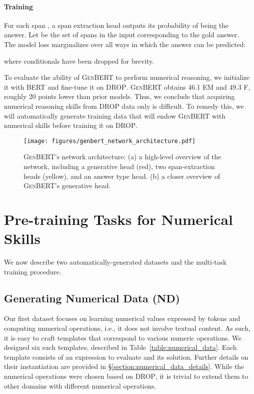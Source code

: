 \documentclass[11pt,a4paper]{article}
\newcommand\bert{\textsc{BERT}}
\newcommand\genbert{\textsc{GenBERT}}
\newcommand\drop{\textsc{DROP}}
\begin{document}
\paragraph{Training}
For each span , a span extraction head  outputs its probability
 of being the answer. Let  be the set of spans in the input corresponding to the gold answer. 
The model loss  marginalizes over all ways in which the answer can be predicted:

where conditionals have been dropped for brevity.

To evaluate the ability of \genbert{} to perform numerical reasoning, we
initialize it with \bert{} and fine-tune it on \drop{}. \genbert{} obtains 46.1
EM and 49.3 F, roughly 20 points
lower than prior models. Thus, we conclude that acquiring numerical reasoning
skills from \drop{} data only is difficult. 
To remedy this, we will 
automatically generate training data that will endow \genbert{} with numerical
skills before training it on \drop{}.











\begin{figure}
\setlength{\belowcaptionskip}{-10pt}
    \centering
    \texttt{[image: figures/genbert\_network\_architecture.pdf]}
    \caption{\genbert{}'s network architecture: (a) a high-level overview of the network, including a generative head (red), two span-extraction heads (yellow), and an answer type head. (b) a closer overview of \genbert{}'s generative head.}
    \label{figure:network_architecture}
\end{figure}
 \section{Pre-training Tasks for Numerical Skills}
\label{sec:pre_training_tasks}
We now describe two automatically-generated datasets and the
multi-task training procedure.


\subsection{Generating Numerical Data (ND)}
\label{section:numerical_data}
Our first dataset focuses on learning numerical values expressed by tokens
and computing numerical operations, i.e., it does not involve textual content.
As such, it is easy to craft templates that correspond to various numeric operations.
We designed six such templates, described in Table~\ref{table:numerical_data}. Each template consists of an expression to evaluate and its solution. Further details on their instantiation are provided in \S\ref{section:numerical_data_details}. While the numerical operations were chosen based on \drop{}, it is trivial to extend them to other domains \cite{saxton2019analysing} with different numerical operations.
\end{document}
